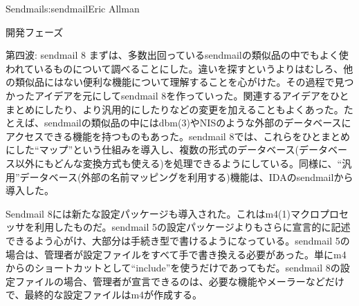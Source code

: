 \begin{aosachapter}{Sendmail}{s:sendmail}{Eric Allman}
\begin{aosasect1}{開発フェーズ}
\begin{aosasect2}{第四波: sendmail 8}
まずは、多数出回っているsendmailの類似品の中でもよく使われているものについて調べることにした。違いを探すというよりはむしろ、他の類似品にはない便利な機能について理解することを心がけた。その過程で見つかったアイデアを元にしてsendmail 8を作っていった。関連するアイデアをひとまとめにしたり、より汎用的にしたりなどの変更を加えることもよくあった。たとえば、sendmailの類似品の中にはdbm(3)やNISのような外部のデータベースにアクセスできる機能を持つものもあった。sendmail 8では、これらをひとまとめにした``マップ''という仕組みを導入し、複数の形式のデータベース(データベース以外にもどんな変換方式も使える)を処理できるようにしている。同様に、``汎用''データベース(外部の名前マッピングを利用する)機能は、IDAのsendmailから導入した。

Sendmail 8には新たな設定パッケージも導入された。これはm4(1)マクロプロセッサを利用したものだ。sendmail 5の設定パッケージよりもさらに宣言的に記述できるよう心がけ、大部分は手続き型で書けるようになっている。sendmail 5の場合は、管理者が設定ファイルをすべて手で書き換える必要があった。単にm4からのショートカットとして``include''を使うだけであってもだ。sendmail 8の設定ファイルの場合、管理者が宣言できるのは、必要な機能やメーラーなどだけで、最終的な設定ファイルはm4が作成する。


\end{aosasect2}
\end{aosasect1}
\end{aosachapter}
